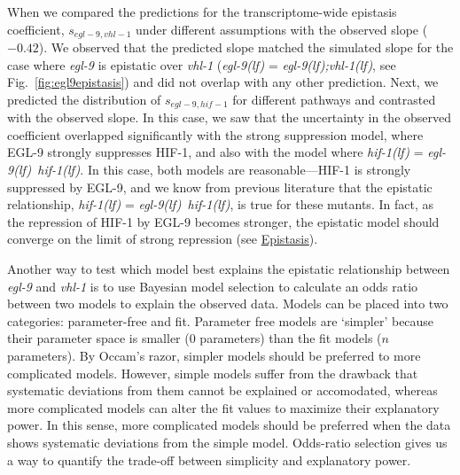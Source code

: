\documentclass[10pt, onecolumn]{article}
\newcommand{\gene}[1]{\emph{#1}}
\newcommand{\egl}{\emph{\mbox{egl-9}(lf)}}
\newcommand{\eglvhl}{\emph{\mbox{egl-9(lf);vhl-1(lf)}}}
\newcommand{\eglhif}{\emph{\mbox{egl-9(lf)}~\mbox{hif-1(lf)}}}
\newcommand{\hif}{\emph{\mbox{hif-1(lf)}}}
\newcommand{\eglp}{EGL-9}
\newcommand{\hifp}{HIF-1}
\begin{document}
When we compared the predictions for the transcriptome-wide epistasis coefficient,
$s_{egl-9,vhl-1}$ under different assumptions with the observed slope ($-0.42$). We
observed that the predicted slope matched the simulated slope for the case where
\gene{egl-9} is epistatic over \gene{vhl-1} (\egl{} = \eglvhl{}, see
Fig.~\ref{fig:egl9epistasis}) and did not overlap with any other prediction.
Next, we predicted the distribution of $s_{egl-9,hif-1}$ for different pathways
and contrasted with the observed slope. In this case, we saw that the uncertainty
in the observed coefficient overlapped significantly with the strong suppression
model, where \eglp{} strongly suppresses \hifp{}, and also with the model where
\hif{} = \eglhif{}. In this case, both models are reasonable---\hifp{} is strongly
suppressed by \eglp{}, and we know from previous literature that the epistatic
relationship, \hif{} = \eglhif{}, is true for these mutants. In fact, as the
repression of \hifp{} by \eglp{} becomes stronger, the epistatic model should converge
on the limit of strong repression (see
\href{https://wormlabcaltech.github.io/mprsq/analysis_notebooks/epistasis_6.html}
{Epistasis}).

Another way to test which model best explains the epistatic relationship between
\gene{egl-9} and \gene{vhl-1} is to use Bayesian model selection to calculate
an odds ratio between two models to explain the observed data. Models can be placed
into two categories: parameter-free and fit. Parameter free models are `simpler'
because their parameter space is smaller (0 parameters) than the fit models ($n$
parameters). By Occam's razor, simpler models should be preferred to more
complicated models. However, simple models suffer from the drawback that
systematic deviations from them cannot be explained or accomodated, whereas more
complicated models can alter the fit values to maximize their explanatory power.
In this sense, more complicated models should be preferred when the data shows
systematic deviations from the simple model. Odds-ratio selection gives us a way
to quantify the trade-off between simplicity and explanatory power.
\end{document}
